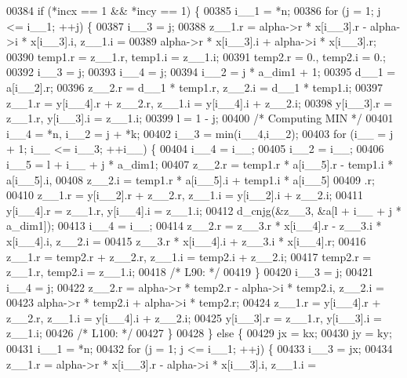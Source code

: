 \begin{DoxyCode}
00384     \textcolor{keywordflow}{if} (*incx == 1 && *incy == 1) \{
00385         i\_\_1 = *n;
00386         \textcolor{keywordflow}{for} (j = 1; j <= i\_\_1; ++j) \{
00387         i\_\_3 = j;
00388         z\_\_1.r = alpha->r * x[i\_\_3].r - alpha->i * x[i\_\_3].i, z\_\_1.i =
00389              alpha->r * x[i\_\_3].i + alpha->i * x[i\_\_3].r;
00390         temp1.r = z\_\_1.r, temp1.i = z\_\_1.i;
00391         temp2.r = 0., temp2.i = 0.;
00392         i\_\_3 = j;
00393         i\_\_4 = j;
00394         i\_\_2 = j * a\_dim1 + 1;
00395         d\_\_1 = a[i\_\_2].r;
00396         z\_\_2.r = d\_\_1 * temp1.r, z\_\_2.i = d\_\_1 * temp1.i;
00397         z\_\_1.r = y[i\_\_4].r + z\_\_2.r, z\_\_1.i = y[i\_\_4].i + z\_\_2.i;
00398         y[i\_\_3].r = z\_\_1.r, y[i\_\_3].i = z\_\_1.i;
00399         l = 1 - j;
00400 \textcolor{comment}{/* Computing MIN */}
00401         i\_\_4 = *n, i\_\_2 = j + *k;
00402         i\_\_3 = min(i\_\_4,i\_\_2);
00403         \textcolor{keywordflow}{for} (i\_\_ = j + 1; i\_\_ <= i\_\_3; ++i\_\_) \{
00404             i\_\_4 = i\_\_;
00405             i\_\_2 = i\_\_;
00406             i\_\_5 = l + i\_\_ + j * a\_dim1;
00407             z\_\_2.r = temp1.r * a[i\_\_5].r - temp1.i * a[i\_\_5].i, 
00408                 z\_\_2.i = temp1.r * a[i\_\_5].i + temp1.i * a[i\_\_5]
00409                 .r;
00410             z\_\_1.r = y[i\_\_2].r + z\_\_2.r, z\_\_1.i = y[i\_\_2].i + z\_\_2.i;
00411             y[i\_\_4].r = z\_\_1.r, y[i\_\_4].i = z\_\_1.i;
00412             d\_cnjg(&z\_\_3, &a[l + i\_\_ + j * a\_dim1]);
00413             i\_\_4 = i\_\_;
00414             z\_\_2.r = z\_\_3.r * x[i\_\_4].r - z\_\_3.i * x[i\_\_4].i, z\_\_2.i =
00415                  z\_\_3.r * x[i\_\_4].i + z\_\_3.i * x[i\_\_4].r;
00416             z\_\_1.r = temp2.r + z\_\_2.r, z\_\_1.i = temp2.i + z\_\_2.i;
00417             temp2.r = z\_\_1.r, temp2.i = z\_\_1.i;
00418 \textcolor{comment}{/* L90: */}
00419         \}
00420         i\_\_3 = j;
00421         i\_\_4 = j;
00422         z\_\_2.r = alpha->r * temp2.r - alpha->i * temp2.i, z\_\_2.i = 
00423             alpha->r * temp2.i + alpha->i * temp2.r;
00424         z\_\_1.r = y[i\_\_4].r + z\_\_2.r, z\_\_1.i = y[i\_\_4].i + z\_\_2.i;
00425         y[i\_\_3].r = z\_\_1.r, y[i\_\_3].i = z\_\_1.i;
00426 \textcolor{comment}{/* L100: */}
00427         \}
00428     \} \textcolor{keywordflow}{else} \{
00429         jx = kx;
00430         jy = ky;
00431         i\_\_1 = *n;
00432         \textcolor{keywordflow}{for} (j = 1; j <= i\_\_1; ++j) \{
00433         i\_\_3 = jx;
00434         z\_\_1.r = alpha->r * x[i\_\_3].r - alpha->i * x[i\_\_3].i, z\_\_1.i =

\end{DoxyCode}
